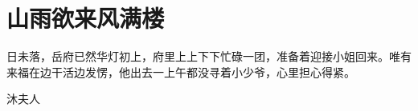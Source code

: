 
\chapter{山雨欲来风满楼}
\label{chap:shan-yu-yu-lai-feng-man-lou}

日未落，岳府已然华灯初上，府里上上下下忙碌一团，准备着迎接小姐回来。唯有来福在边干活边发愣，他出去一上午都没寻着小少爷，心里担心得紧。

沐夫人
